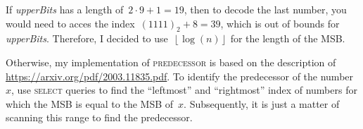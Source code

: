 \documentclass[a4paper,UKenglish,cleveref, autoref, thm-restate]{lipics-v2021}
\begin{document}
	If \textit{upperBits} has a length of~$2\cdot9+1 = 19$, then to decode the last number, you would need to acces the index~$\left(1111\right)_2 + 8 = 39$, which is out of bounds for \textit{upperBits}. Therefore, I decided to use~$\left\lfloor \log\left(n\right)\right\rfloor$ for the length of the MSB.
	
	Otherwise, my implementation of \textsc{predecessor} is based on the description of \url{https://arxiv.org/pdf/2003.11835.pdf}. To identify the predecessor of the number~$x$, use \textsc{select} queries to find the ``leftmost'' and ``rightmost'' index of numbers for which the MSB is equal to the MSB of~$x$. Subsequently, it is just a matter of scanning this range to find the predecessor.
	
	
\end{document}
